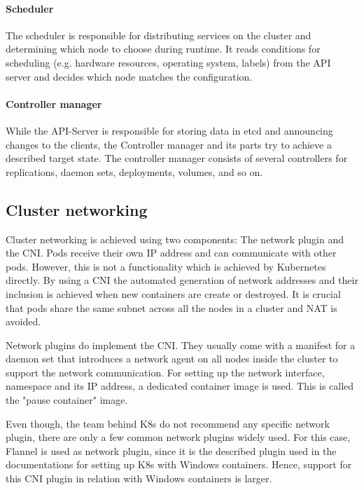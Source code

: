 \paragraph{Scheduler} The scheduler is responsible for distributing services on the cluster and determining which node to choose during runtime. It reads conditions for scheduling (e.g. hardware resources, operating system, labels) from the API server and decides which node matches the configuration\cite{Luksa.2018}.

\paragraph{Controller manager} While the API-Server is responsible for storing data in etcd and announcing changes to the clients, the Controller manager and its parts try to achieve a described target state\cite{Luksa.2018}. The controller manager consists of several controllers for replications, daemon sets, deployments, volumes, and so on.


\subsection{Cluster networking}
Cluster networking is achieved using two components: The network plugin and the \ac{CNI}. Pods receive their own \ac{IP} address and can communicate with other pods. However, this is not a functionality which is achieved by Kubernetes directly. By using a \ac{CNI} the automated generation of network addresses and their inclusion is achieved when new containers are create or destroyed. It is crucial that pods share the same subnet across all the nodes in a cluster and \ac{NAT} is avoided\cite{Luksa.2018}.

Network plugins do implement the \ac{CNI}. They usually come with a manifest for a daemon set that introduces a network agent on all nodes inside the cluster to support the network communication.
For setting up the network interface, namespace and its \ac{IP} address, a dedicated container image is used. This is called the "pause container" image.

Even though, the team behind \ac{K8s} do not recommend any specific network plugin, there are only a few common network plugins widely used. For this case, Flannel is used as network plugin, since it is the described plugin used in the documentations for setting up \ac{K8s} with Windows containers\cite{GitHubKubernetesSIGWindowsTools.20230213,Kubernetes.20220419}. Hence, support for this \ac{CNI} plugin in relation with Windows containers is larger.

